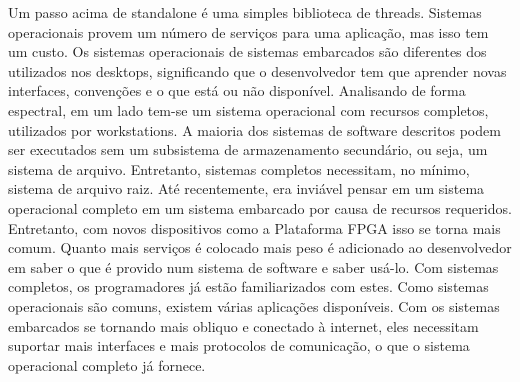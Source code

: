 Um passo acima de standalone é uma simples biblioteca de threads. Sistemas operacionais provem um número de serviços para uma aplicação, mas isso tem um custo. Os sistemas operacionais de sistemas embarcados são diferentes dos utilizados nos desktops, significando que o desenvolvedor tem que aprender novas interfaces, convenções e o que está ou não disponível. Analisando de forma espectral, em um lado tem-se um sistema operacional com recursos completos, utilizados por workstations. A maioria dos sistemas de software descritos podem ser executados sem um subsistema de armazenamento secundário, ou seja, um sistema de arquivo. Entretanto, sistemas completos necessitam, no mínimo, sistema de arquivo raiz. Até recentemente, era inviável pensar em um sistema operacional completo em um sistema embarcado por causa de recursos requeridos. Entretanto, com novos dispositivos como a Plataforma FPGA isso se torna mais comum. Quanto mais serviços é colocado mais peso é adicionado ao desenvolvedor em saber o que é provido num sistema de software e saber usá-lo. Com sistemas completos, os programadores já estão familiarizados com estes. Como sistemas operacionais são comuns, existem várias aplicações disponíveis. Com os sistemas embarcados se tornando mais obliquo e conectado à internet, eles necessitam suportar mais interfaces e mais protocolos de comunicação, o que o sistema operacional completo já fornece.

